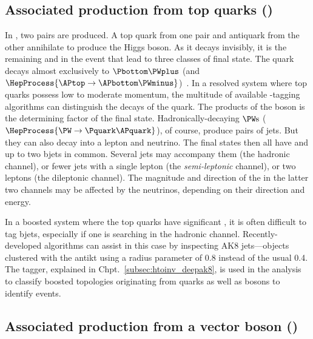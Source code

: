 

\subsection{Associated production from top quarks (\texorpdfstring{\ttH}{ttH})}
\label{subsec:htoinv_ttH}

In \ttH, two \ttbar pairs are produced. A top quark \Ptop from one pair and antiquark \APtop from the other annihilate to produce the Higgs boson. As it decays invisibly, it is the remaining \Ptop and \APtop in the event that lead to three classes of final state. The \Ptop quark decays almost exclusively to $\Pbottom\PWplus$ (and $\HepProcess{\APtop \to \APbottom\PWminus}$)~\cite{PhysRevD.98.030001}. In a resolved system where top quarks possess low to moderate momentum, the multitude of available \Pbottom-tagging algorithms can distinguish the decays of the \Pbottom quark. The products of the \PW boson is the determining factor of the final state. Hadronically-decaying $\PW\text{s}$ ($\HepProcess{\PW \to \Pquark\APquark}$), of course, produce pairs of \glspl{jet}. But they can also decay into a lepton and neutrino. The final states then all have \ptmiss and up to two \glspl{bjet} in common. Several \glspl{jet} may accompany them (the hadronic channel), or fewer \glspl{jet} with a single lepton (the \emph{semi-leptonic} channel), or two leptons (the dileptonic channel). The magnitude and direction of the \ptmiss in the latter two channels may be affected by the neutrinos, depending on their direction and energy.

In a boosted system where the top quarks have significant \pt, it is often difficult to tag \glspl{bjet}, especially if one is searching in the hadronic channel. Recently-developed algorithms can assist in this case by inspecting AK8 \glspl{jet}---objects clustered with the \gls{antikt} using a radius parameter of 0.8 instead of the usual 0.4. The \deepakeight tagger, explained in Chpt.~\ref{subsec:htoinv_deepak8}, is used in the analysis to classify boosted topologies originating from \Ptop quarks as well as \PVec bosons to identify \ttH events.




\subsection{Associated production from a vector boson (\texorpdfstring{\VH}{VH})}
\label{subsec:htoinv_VH}

